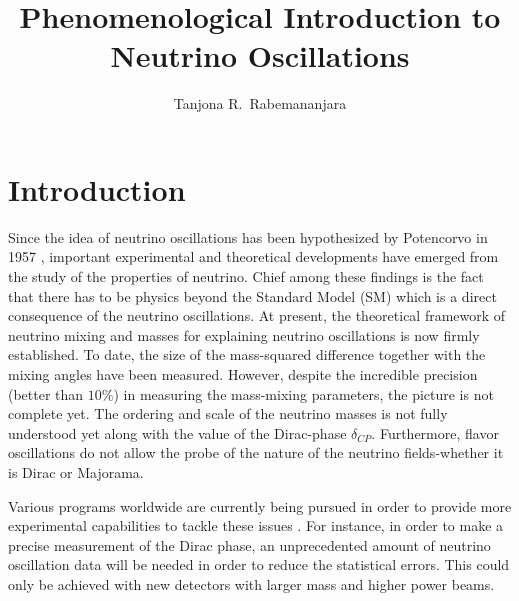 \documentclass[twocolumn,secnumarabic,amssymb, nobibnotes, aps, prd,10pt]{revtex4-1}
\begin{document}
\title{\texorpdfstring{Phenomenological Introduction to Neutrino Oscillations}{Phenomenological Introduction to Neutrino Oscillations}}

\author{Tanjona R.\ Rabemananjara}

\maketitle

\section{Introduction}

Since the idea of neutrino oscillations has been hypothesized by Potencorvo in 1957
\cite{Potencorvo:1957cp, Xontecorvo:1957qd}, important experimental and theoretical
developments have emerged from the study of the properties of neutrino. Chief among
these findings is the fact that there has to be physics beyond the Standard Model 
(SM) which is a direct consequence of the neutrino oscillations. At present, the 
theoretical framework of neutrino mixing and masses for explaining neutrino
oscillations is now firmly established. To date, the size of the mass-squared 
difference together with the mixing angles have been measured. However, despite the
incredible precision (better than $10 \%$) in measuring the mass-mixing parameters, 
the picture is not complete yet. The ordering and scale of the neutrino masses is not
fully understood yet along with the value of the Dirac-phase $\delta_{CP}$. Furthermore, 
flavor oscillations do not allow the probe of the nature of the neutrino fields-whether 
it is Dirac or Majorama.

Various programs worldwide are currently being pursued in order to provide more
experimental capabilities to tackle these issues \cite{Acciarri:2015uup, Antonello:2015lea, 
An:2015jdp, Djurcic:2015vqa, Adamson:2016tbq, Kim:2014rfa, Adamson:2016xxw, Abe:2015awa,
Adams:2013qkq}. For instance, in order to make a precise measurement of the Dirac phase, an 
unprecedented amount of neutrino oscillation data will be needed in order to reduce the 
statistical errors. This could only be achieved with new detectors with larger mass and 
higher power beams.
\end{document}
